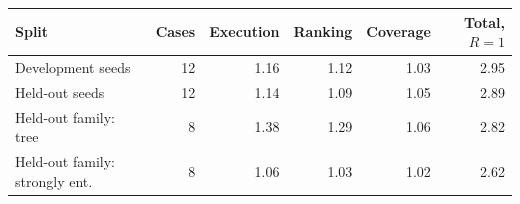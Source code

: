 \begin{tabular}{lrrrrr}
\toprule
Split & Cases & Execution & Ranking & Coverage & Total, $R{=}1$\\
\midrule
Development seeds & 12 & 1.16 & 1.12 & 1.03 & 2.95\\
Held-out seeds & 12 & 1.14 & 1.09 & 1.05 & 2.89\\
Held-out family: tree & 8 & 1.38 & 1.29 & 1.06 & 2.82\\
Held-out family: strongly ent. & 8 & 1.06 & 1.03 & 1.02 & 2.62\\
\bottomrule
\end{tabular}
